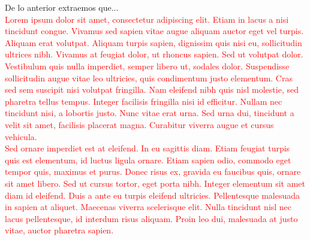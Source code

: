 \documentclass[print, color]{ugrTFG}
\begin{document}
 De lo anterior extraemos que...\\
\textcolor{red}{
 Lorem ipsum dolor sit amet, consectetur adipiscing elit. Etiam in lacus a nisi tincidunt congue. Vivamus sed sapien vitae augue aliquam auctor eget vel turpis. Aliquam erat volutpat. Aliquam turpis sapien, dignissim quis nisi eu, sollicitudin ultrices nibh. Vivamus at feugiat dolor, ut rhoncus sapien. Sed ut volutpat dolor. Vestibulum quis nulla imperdiet, semper libero ut, sodales dolor. Suspendisse sollicitudin augue vitae leo ultricies, quis condimentum justo elementum. Cras sed sem suscipit nisi volutpat fringilla. Nam eleifend nibh quis nisl molestie, sed pharetra tellus tempus. Integer facilisis fringilla nisi id efficitur. Nullam nec tincidunt nisi, a lobortis justo. Nunc vitae erat urna. Sed urna dui, tincidunt a velit sit amet, facilisis placerat magna. Curabitur viverra augue et cursus vehicula.\\ 
Sed ornare imperdiet est at eleifend. In eu sagittis diam. Etiam feugiat turpis quis est elementum, id luctus ligula ornare. Etiam sapien odio, commodo eget tempor quis, maximus et purus. Donec risus ex, gravida eu faucibus quis, ornare sit amet libero. Sed ut cursus tortor, eget porta nibh. Integer elementum sit amet diam id eleifend. Duis a ante eu turpis eleifend ultricies. Pellentesque malesuada in sapien at aliquet. Maecenas viverra scelerisque elit. Nulla tincidunt nisl nec lacus pellentesque, id interdum risus aliquam. Proin leo dui, malesuada at justo vitae, auctor pharetra sapien.
}\\ \newline
\end{document}
